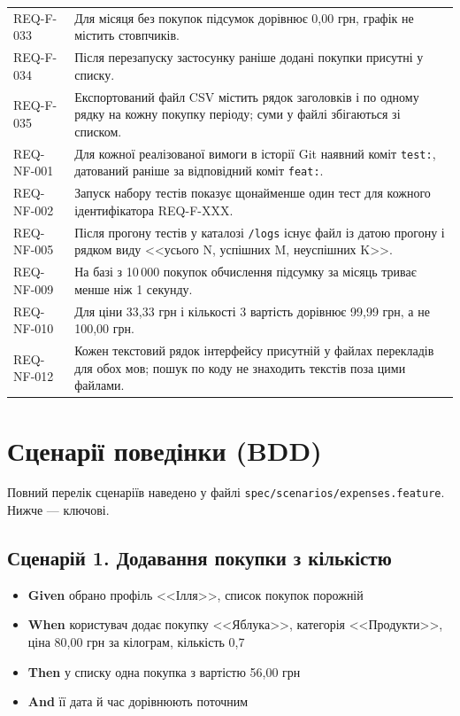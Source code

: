 \documentclass[12pt,a4paper]{article}
\begin{document}
\begin{longtable}{@{}p{}p{}@{}}
REQ-F-033 & Для місяця без покупок підсумок дорівнює 0,00 грн, графік не містить стовпчиків. \\
REQ-F-034 & Після перезапуску застосунку раніше додані покупки присутні у списку. \\
REQ-F-035 & Експортований файл CSV містить рядок заголовків і по одному рядку на кожну покупку періоду; суми у файлі збігаються зі списком. \\
REQ-NF-001 & Для кожної реалізованої вимоги в історії Git наявний коміт \texttt{test:}, датований раніше за відповідний коміт \texttt{feat:}. \\
REQ-NF-002 & Запуск набору тестів показує щонайменше один тест для кожного ідентифікатора REQ-F-XXX. \\
REQ-NF-005 & Після прогону тестів у каталозі \texttt{/logs} існує файл із датою прогону і рядком виду <<усього N, успішних M, неуспішних K>>. \\
REQ-NF-009 & На базі з 10\,000 покупок обчислення підсумку за місяць триває менше ніж 1 секунду. \\
REQ-NF-010 & Для ціни 33,33 грн і кількості 3 вартість дорівнює 99,99 грн, а не 100,00 грн. \\
REQ-NF-012 & Кожен текстовий рядок інтерфейсу присутній у файлах перекладів для обох мов; пошук по коду не знаходить текстів поза цими файлами. \\
\bottomrule
\end{longtable}

\section{Сценарії поведінки (BDD)}
Повний перелік сценаріїв наведено у файлі \texttt{spec/scenarios/expenses.feature}. Нижче --- ключові.

\subsection*{Сценарій 1. Додавання покупки з кількістю}
\begin{itemize}
  \item \textbf{Given} обрано профіль <<Ілля>>, список покупок порожній
  \item \textbf{When} користувач додає покупку <<Яблука>>, категорія <<Продукти>>, ціна 80,00 грн за кілограм, кількість 0,7
  \item \textbf{Then} у списку одна покупка з вартістю 56,00 грн
  \item \textbf{And} її дата й час дорівнюють поточним
\end{itemize}
\end{document}
